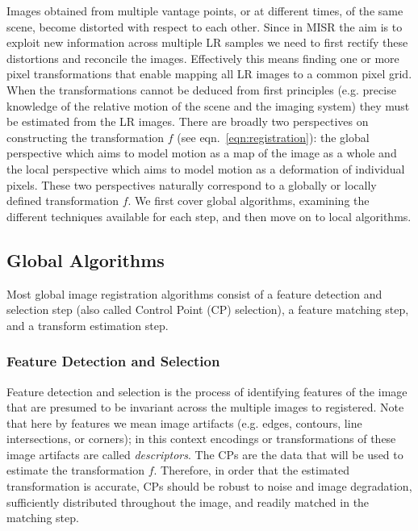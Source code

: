 
Images obtained from multiple vantage points, or at different times, of the same scene, become distorted with respect
to each other.
%
Since in MISR the aim is to exploit new information across multiple LR samples we need to first rectify these distortions and reconcile the images.
%
Effectively this means finding one or more pixel transformations that enable mapping all LR images to a common pixel grid.
%
When the transformations cannot be deduced from first principles (e.g. precise knowledge of the relative motion of the scene and the imaging system) they must be estimated from the LR images.
%
There are broadly two perspectives on constructing the transformation $f$ (see eqn.~\eqref{eqn:registration}): the global perspective which aims to model motion as a map of the image as a whole and the local perspective which aims to model motion as a deformation of individual pixels.
%
These two perspectives naturally correspond to a globally or locally defined transformation $f$.
%
We first cover global algorithms, examining the different techniques available for each step, and then move on to local algorithms.

\subsection{Global Algorithms}

Most global image registration algorithms consist of a feature detection and selection step (also called Control Point (CP) selection), a feature matching step, and a transform estimation step.
%

\subsubsection{Feature Detection and Selection}

Feature detection and selection is the process of identifying features of the image that are presumed to be invariant across the multiple images to registered.
%
Note that here by features we mean image artifacts (e.g. edges, contours, line intersections, or corners); in this context encodings or transformations of these image artifacts are called \textit{descriptors}.
%
The CPs are the data that will be used to estimate the transformation $f$.
%
Therefore, in order that the estimated transformation is accurate, CPs should be robust to noise and image degradation, sufficiently distributed throughout the image, and readily matched in the matching step.

